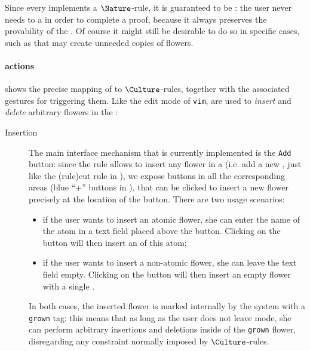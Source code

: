 \begin{scope}
Since every   implements a $\Nature$-rule, it is guaranteed to be
\emph{}: the user never needs to  a   in order to
complete a proof, because it always preserves the provability of the . Of
course it might still be desirable to do so in specific cases, such as
  that may create unneeded copies of flowers.

\paragraph{ actions}

 shows the precise mapping of   to
$\Culture$-rules, together with the associated gestures for triggering them.
Like the edit mode of \texttt{vim},   are used to \emph{insert} and
\emph{delete} arbitrary flowers in the :
\begin{description}
  \item[Insertion] The main interface mechanism that is currently
  implemented is the \texttt{Add} button: since the  rule allows to
  insert any flower in a   (i.e. add a new , just like the
  \kl(rule){cut} rule in ), we expose buttons in all the corresponding
  areas (blue ``+'' buttons in ), that can be
  clicked to insert a new flower precisely at the location of the button. There
  are two usage scenarios:
  \begin{itemize}
    \item if the user wants to insert an atomic flower, she can enter the name
    of the atom in a text field placed above the button. Clicking on the button
    will then insert an  of this atom;
    \item if the user wants to insert a non-atomic flower, she can leave the
    text field empty. Clicking on the button will then insert an empty flower
    with a single .
  \end{itemize}
  In both cases, the inserted flower is marked internally by the system with a
  \texttt{grown} tag: this means that as long as the user does not leave
   mode, she can perform arbitrary insertions and deletions inside of
  the \texttt{grown} flower, disregarding any  constraint normally
  imposed by $\Culture$-rules.
  

\end{description}
\end{scope}
